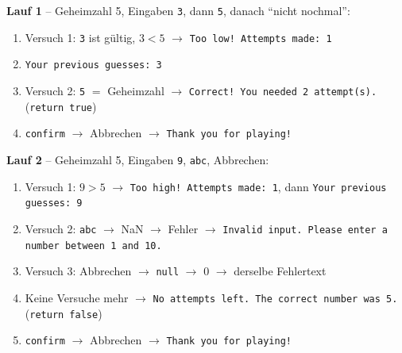 \documentclass[a4paper,11pt]{article}
\begin{document}
\begin{ergebnis}
\textbf{Lauf 1} -- Geheimzahl 5, Eingaben \texttt{3}, dann \texttt{5}, danach "`nicht nochmal"':
\begin{enumerate}[nosep]
\item Versuch 1: \texttt{3} ist gültig, $3 < 5$ $\to$ \texttt{Too low! Attempts made: 1}
\item \texttt{Your previous guesses: 3}
\item Versuch 2: \texttt{5} $=$ Geheimzahl $\to$ \texttt{Correct! You needed 2 attempt(s).} (\texttt{return true})
\item \texttt{confirm} $\to$ Abbrechen $\to$ \texttt{Thank you for playing!}
\end{enumerate}

\textbf{Lauf 2} -- Geheimzahl 5, Eingaben \texttt{9}, \texttt{abc}, Abbrechen:
\begin{enumerate}[nosep]
\item Versuch 1: $9 > 5$ $\to$ \texttt{Too high! Attempts made: 1}, dann \texttt{Your previous guesses: 9}
\item Versuch 2: \texttt{abc} $\to$ NaN $\to$ Fehler $\to$ \texttt{Invalid input. Please enter a number between 1 and 10.}
\item Versuch 3: Abbrechen $\to$ \texttt{null} $\to$ 0 $\to$ derselbe Fehlertext
\item Keine Versuche mehr $\to$ \texttt{No attempts left. The correct number was 5.} (\texttt{return false})
\item \texttt{confirm} $\to$ Abbrechen $\to$ \texttt{Thank you for playing!}
\end{enumerate}
\end{ergebnis}
\end{document}
